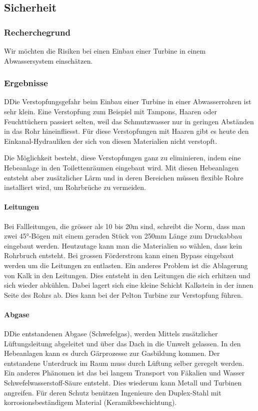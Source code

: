 \subsection{Sicherheit}


\subsubsection{Recherchegrund}
Wir möchten die Risiken bei einen Einbau einer Turbine in einem Abwassersystem  einschätzen.

\subsubsection{Ergebnisse}
DDie Verstopfungsgefahr beim Einbau einer Turbine in einer Abwasserrohren ist sehr klein. 
Eine Verstopfung zum Beispiel mit Tampons, Haaren oder Feuchttüchern passiert selten, weil das Schmutzwasser nur in geringen Abständen in das Rohr hineinfliesst. 
Für diese Verstopfungen mit Haaren gibt es heute den Einkanal-Hydrauliken der sich von diesen Materialien nicht verstopft.

Die Möglichkeit besteht, diese Verstopfungen ganz zu eliminieren, indem eine Hebeanlage in den Toilettenräumen eingebaut wird. Mit diesen Hebeanlagen entsteht aber zusätzlicher Lärm und in deren Bereichen müssen flexible Rohre installiert wird, um Rohrbrüche zu vermeiden.
\paragraph{Leitungen}
Bei Fallleitungen, die grösser als 10 bis 20\si{m} sind, schreibt die Norm, dass man zwei 45°-Bögen mit einem geraden Stück von 250\si{mm} Länge zum Druckabbau eingebaut werden. Heutzutage kann man die Materialien so wählen, dass kein Rohrbruch entsteht. Bei grossen Förderstrom kann einen Bypass eingebaut werden um die Leitungen zu entlasten. 
Ein anderes Problem ist die Ablagerung von Kalk in den Leitungen. Dies entsteht in den Leitungen die sich erhitzen und sich wieder abkühlen. Dabei lagert sich eine kleine Schicht Kalkstein in der innen Seite des Rohrs ab. Dies kann bei der Pelton Turbine zur Verstopfung führen.
\paragraph{Abgase}
DDie entstandenen Abgase (Schwefelgas), werden Mittels zusätzlicher Lüftungsleitung abgeleitet und über das Dach in die Umwelt gelassen. In den Hebeanlagen kann es durch Gärprozesse zur Gasbildung kommen. Der entstandene Unterdruck im Raum muss durch Lüftung selber geregelt werden. 
Ein anderes Phänomen ist das bei langem Transport von Fäkalien und Wasser Schwefelwasserstoff-Säure entsteht. Dies wiederum kann Metall und Turbinen angreifen. Für deren Schutz benützen Ingenieure den Duplex-Stahl mit korrosionsbeständigem Material (Keramikbeschichtung).




